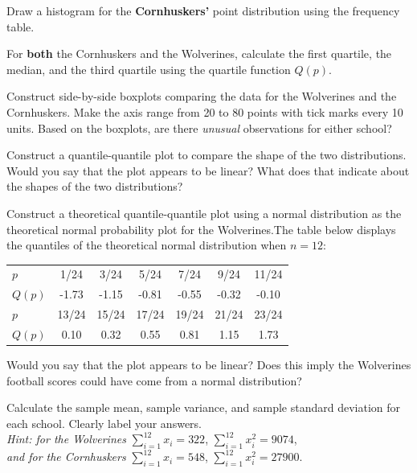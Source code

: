 \documentclass[11pt]{article}\usepackage[]{graphicx}\usepackage[]{color}
\newcommand{\dsum} {\displaystyle\sum}
\begin{document}
\item Draw a histogram for the \textbf{Cornhuskers'} point distribution using the frequency table.

\item For \textbf{both} the Cornhuskers and the Wolverines, calculate the first quartile, the median, and the third quartile using the quartile function $Q(p)$.

\item Construct side-by-side boxplots comparing the data for the Wolverines and the Cornhuskers. Make the axis range from 20 to 80 points with tick marks every 10 units. Based on the boxplots, are there \emph{unusual} observations for either school?

\item Construct a quantile-quantile plot to compare the shape of the two distributions. Would you say that the plot appears to be linear? What does that indicate about the shapes of the two distributions? 

\item Construct a theoretical quantile-quantile plot using a normal distribution as the theoretical normal probability plot for the Wolverines.The table below displays the quantiles of the theoretical normal distribution when $n=12$:

\begin{center}
\begin{tabular}{| l | c c c c c c |}\hline
	$p$ & 1/24 & 3/24 & 5/24 & 7/24 & 9/24 & 11/24\\
	$Q(p)$ & -1.73 & -1.15 & -0.81 & -0.55 & -0.32 & -0.10\\ \hline\hline
	$p$ & 13/24 & 15/24 & 17/24 & 19/24 & 21/24 & 23/24\\
	$Q(p)$ & 0.10 & 0.32 & 0.55 & 0.81 & 1.15 & 1.73\\\hline
\end{tabular}
\end{center}

Would you say that the plot appears to be linear? Does this imply the Wolverines football scores could have come from a normal distribution?

\item Calculate the sample mean, sample variance, and sample standard deviation for each school. Clearly label your answers.\\
\emph{Hint: for the Wolverines} $\dsum^{12}_{i=1} x_i = 322$, $\dsum^{12}_{i=1} x_i^2 = 9074$, \\ \emph{and for the Cornhuskers} $\dsum^{12}_{i=1} x_i = 548$, $\dsum^{12}_{i=1} x_i^2 = 27900$.
\end{document}
